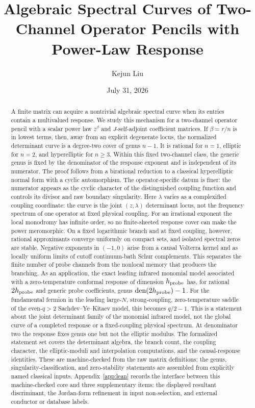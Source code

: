 \documentclass[11pt,reqno]{amsart}
\title[Two-Channel Power-Law Spectral Curves]
{Algebraic Spectral Curves of Two-Channel Operator Pencils with Power-Law Response}
\author{Kejun Liu}
\date{July 31, 2026}
\theoremstyle{remark}
\newcommand{\den}{\operatorname{den}}
\begin{document}
\setcounter{tocdepth}{1}

\begin{abstract}
A finite matrix can acquire a nontrivial algebraic spectral curve when its
entries contain a multivalued response.  We study this mechanism for a
two-channel operator pencil with a scalar power law $z^\beta$ and
$J$-self-adjoint coefficient matrices.  If $\beta=r/n$ is in lowest terms,
then, away from an explicit degenerate locus, the normalized determinant
curve is a degree-two cover of genus $n-1$.  It is rational for $n=1$,
elliptic for $n=2$, and hyperelliptic for $n\geq3$.  Within this fixed
two-channel class, the generic genus is fixed by the denominator of the
response exponent and is independent of its numerator.  The proof follows
from a birational reduction to a classical hyperelliptic normal form with a
cyclic automorphism.  The operator-specific datum is finer: the numerator
appears as the cyclic character of the distinguished coupling function and
controls its divisor and raw boundary singularity.  Here $\lambda$ varies as a
complexified coupling coordinate: the curve is the joint $(z,\lambda)$
determinant locus, not the frequency spectrum of one operator at fixed
physical coupling.
For an irrational exponent the local monodromy has infinite order, so no
finite-sheeted response cover can make the power meromorphic.  On a fixed
logarithmic branch and at fixed coupling, however, rational approximants
converge uniformly on compact sets, and isolated spectral zeros are stable.
Negative exponents in $(-1,0)$ arise from a causal Volterra kernel and as
locally uniform limits of cutoff continuum-bath Schur complements.  This
separates the finite number of probe channels from the nonlocal memory that
produces the branching.
As an application, the exact leading infrared monomial model associated with
a zero-temperature conformal response of dimension $h_{\rm probe}$ has, for
rational $2h_{\rm probe}$ and generic probe coefficients, genus
$\den(2h_{\rm probe})-1$.  For the fundamental fermion in the leading
large-$N$, strong-coupling, zero-temperature saddle of the even-$q>2$
Sachdev--Ye--Kitaev model, this becomes $q/2-1$.  This is a statement about
the joint determinant family of the monomial infrared model, not the global
curve of a completed response or a fixed-coupling physical spectrum.  At
denominator two the response fixes genus one but not the elliptic modulus.
The formalized statement set covers the determinant algebra, the branch
count, the coupling character, the elliptic-moduli and interpolation
computations, and the causal-response identities.  These are machine-checked
from the raw matrix definitions; the genus, singularity-classification, and
zero-stability statements are assembled from explicitly named classical
inputs.  Appendix~\ref{app:lean} records the interface between this
machine-checked core and three supplementary items: the displayed resultant
discriminant, the Jordan-form refinement in input non-selection, and
external conductor or database labels.
\end{abstract}
\end{document}
